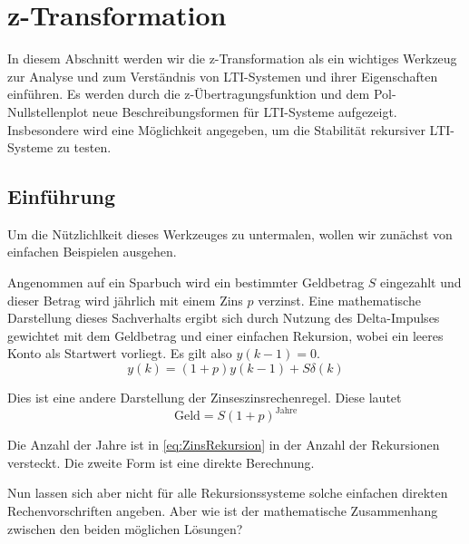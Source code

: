 \chapter{z-Transformation}
In diesem Abschnitt werden wir die z-Transformation als ein
wichtiges Werkzeug zur Analyse und zum Verständnis
von LTI-Systemen und ihrer Eigenschaften einführen.
Es werden durch die z-Übertragungsfunktion und dem Pol-Nullstellenplot neue
Beschreibungsformen für LTI-Systeme aufgezeigt.
Insbesondere wird eine Möglichkeit angegeben, um die Stabilität rekursiver LTI-Systeme
zu testen.


\section{Einführung}
Um die Nützlichlkeit dieses Werkzeuges zu untermalen, wollen wir
zunächst von einfachen Beispielen ausgehen.

Angenommen auf ein Sparbuch wird ein bestimmter Geldbetrag $S$
eingezahlt und dieser Betrag wird jährlich mit einem Zins $p$
verzinst. Eine mathematische Darstellung dieses Sachverhalts ergibt sich durch Nutzung des Delta-Impulses gewichtet
mit dem Geldbetrag und einer einfachen Rekursion, wobei ein leeres Konto als Startwert vorliegt. Es gilt also $y(k-1) = 0$.
\begin{equation}\label{eq:ZinsRekursion}
y(k) = (1+p) y(k-1) + S \delta(k)
\end{equation}

Dies ist eine andere Darstellung der Zinseszinsrechenregel. Diese lautet
\begin{equation}
    \mbox{Geld} = S (1+p)^{\mbox{Jahre}}
\end{equation}

Die Anzahl der Jahre ist in \ref{eq:ZinsRekursion} in der Anzahl
der Rekursionen versteckt. Die zweite Form ist eine direkte
Berechnung.

Nun lassen sich aber nicht für alle Rekursionssysteme solche
einfachen direkten Rechenvorschriften angeben. Aber wie ist der mathematische Zusammenhang zwischen den beiden möglichen Lösungen?

